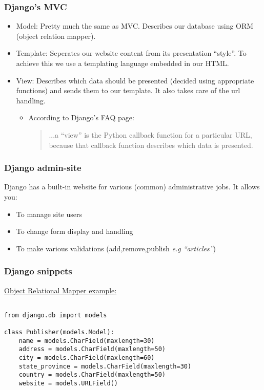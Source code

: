 \documentclass{beamer}
\begin{document}
\begin{frame}
  \frametitle{Django's MVC}
\begin{itemize}[<+->]
  \item Model: Pretty much the same as MVC. Describes our database using ORM (object relation mapper).
  \item Template: Seperates our website content from its presentation ``style''. To achieve this we use a templating language embedded in our HTML.
  \item View: Describes which data should be presented (decided using appropriate functions) and sends them to our template. It also takes care of the url handling.
    \begin{itemize}
      \item According to Django's FAQ page: \begin{quote}...a “view” is the Python callback function for a particular URL, because that callback function describes which data is presented. \end{quote}
    \end{itemize}
\end{itemize}
\end{frame}

\begin{frame}
  \frametitle{Django admin-site}
Django has a built-in website for various (common) administrative jobs. It allows you:
\begin{itemize}
  \item To manage site users
  \item To change form display and handling
  \item To make various validations (add,remove,publish \textit{e.g ``articles''})
\end{itemize}
\end{frame}

\begin{frame}[fragile]
  \frametitle{Django snippets}
\underline{Object Relational Mapper example:}

	\begin{verbatim}

from django.db import models

class Publisher(models.Model):
    name = models.CharField(maxlength=30)
    address = models.CharField(maxlength=50)
    city = models.CharField(maxlength=60)
    state_province = models.CharField(maxlength=30)
    country = models.CharField(maxlength=50)
    website = models.URLField()

	\end{verbatim}

\end{frame}
\end{document}
